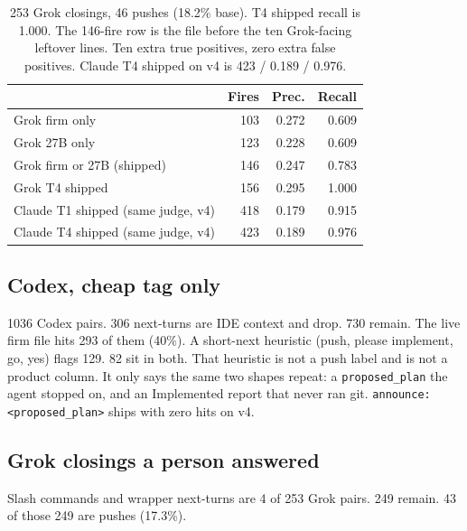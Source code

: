 \begin{table}[ht]
\centering
{\small\begin{tabular}{lrrr}
\toprule
 & Fires & Prec. & Recall \\
\midrule
Grok firm only & 103 & 0.272 & 0.609 \\
Grok 27B only & 123 & 0.228 & 0.609 \\
Grok firm or 27B (shipped) & 146 & 0.247 & 0.783 \\
Grok T4 shipped & 156 & 0.295 & 1.000 \\
Claude T1 shipped (same judge, v4) & 418 & 0.179 & 0.915 \\
Claude T4 shipped (same judge, v4) & 423 & 0.189 & 0.976 \\
\bottomrule
\end{tabular}}
\caption{253 Grok closings, 46 pushes (18.2\% base). T4 shipped
recall is 1.000. The 146-fire row is the file before the ten
Grok-facing leftover lines. Ten extra true positives, zero extra
false positives. Claude T4 shipped on v4 is 423 / 0.189 / 0.976.}
\label{tab:grokshipped}
\end{table}

\subsection{Codex, cheap tag only}
\label{sec:codexcheap}

1036 Codex pairs. 306 next-turns are IDE context and drop. 730
remain. The live firm file hits 293 of them (40\%). A short-next
heuristic (push, please implement, go, yes) flags 129. 82 sit in
both. That heuristic is not a push label and is not a product
column. It only says the same two shapes repeat: a
\texttt{proposed\_plan} the agent stopped on, and an Implemented
report that never ran git. \texttt{announce: <proposed\_plan>}
ships with zero hits on v4.

\subsection{Grok closings a person answered}
\label{sec:grokhuman}

Slash commands and wrapper next-turns are 4 of 253 Grok pairs.
249 remain. 43 of those 249 are pushes (17.3\%).

